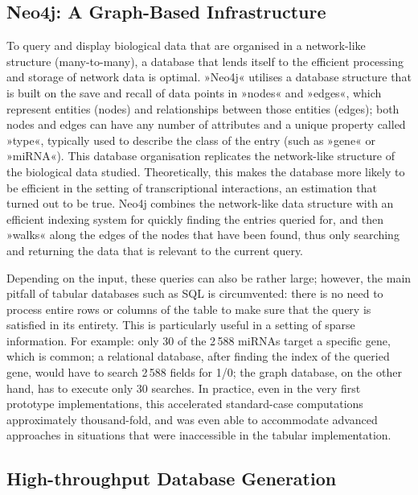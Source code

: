 \subsection{Neo4j: A Graph-Based Infrastructure}
To query and display biological data that are organised in a network-like structure (many-to-many), a database that lends itself to the efficient processing and storage of network data is optimal. »Neo4j« utilises a database structure that is built on the save and recall of data points in »nodes« and »edges«, which represent entities (nodes) and relationships between those entities (edges); both nodes and edges can have any number of attributes and a unique property called »type«, typically used to describe the class of the entry (such as »gene« or »miRNA«). This database organisation replicates the network-like structure of the biological data studied. Theoretically, this makes the database more likely to be efficient in the setting of transcriptional interactions, an estimation that turned out to be true. Neo4j combines the network-like data structure with an efficient indexing system for quickly finding the entries queried for, and then »walks« along the edges of the nodes that have been found, thus only searching and returning the data that is relevant to the current query.


Depending on the input, these queries can also be rather large; however, the main pitfall of tabular databases such as SQL is circumvented: there is no need to process entire rows or columns of the table to make sure that the query is satisfied in its entirety. This is particularly useful in a setting of sparse information. For example: only 30 of the 2\,588 miRNAs target a specific gene, which is common; a relational database, after finding the index of the queried gene, would have to search 2\,588 fields for 1/0; the graph database, on the other hand, has to execute only 30 searches. In practice, even in the very first prototype implementations, this accelerated standard-case computations approximately thousand-fold, and was even able to accommodate advanced approaches in situations that were inaccessible in the tabular implementation.

\subsection{High-throughput Database Generation}

